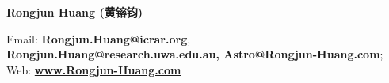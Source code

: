 \documentclass{res}
\begin{document}
 
\thispagestyle{empty} %
\begin{center}
{\bf \LARGE
Rongjun Huang {\bf \Large(黄镕钧)\\ \vspace{4pt}}}


Email: {\bf Rongjun.Huang@icrar.org}, \\
{\bf Rongjun.Huang@research.uwa.edu.au, Astro@Rongjun-Huang.com}; \\
Web: \href{https://www.Rongjun-Huang.com}{\bf www.Rongjun-Huang.com} \\
\end{center}
\end{document}
